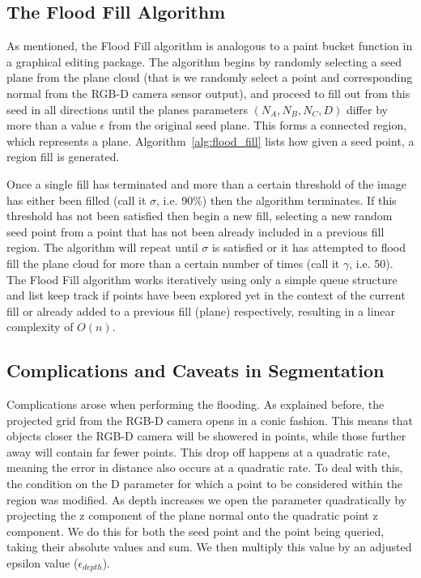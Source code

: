 \documentclass[]{article}
\begin{document}
{\subsection{The Flood Fill Algorithm}
\label{sub:flood_fill_algo}
As mentioned, the Flood Fill algorithm is analogous to a paint bucket function in a graphical editing package. The algorithm begins by randomly selecting a seed plane from the plane cloud (that is we randomly select a point and corresponding normal from the RGB-D camera sensor output), and proceed to fill out from this seed in all directions until the planes parameters $(N_A, N_B, N_C, D)$ differ by more than a value $\epsilon$ from the original seed plane. This forms a connected region, which represents a plane. Algorithm~\ref{alg:flood_fill} lists how given a seed point, a region fill is generated.

Once a single fill has terminated and more than a certain threshold of the image has either been filled (call it $\sigma$, i.e. 90\%) then the algorithm terminates. If this threshold has not been satisfied then begin a new fill, selecting a new random seed point from a point that has not been already included in a previous fill region. The algorithm will repeat until $\sigma$ is satisfied or it has attempted to flood fill the plane cloud for more than a certain number of times (call it $\gamma$, i.e. 50). The Flood Fill algorithm works iteratively using only a simple queue structure and list keep track if points have been explored yet in the context of the current fill or already added to a previous fill (plane) respectively, resulting in a linear complexity of $O(n)$. 


\subsection{Complications and Caveats in Segmentation} %
\label{sub:complications_in_the_segmentation_algorithm}


Complications arose when performing the flooding. As explained before, the projected grid from the RGB-D camera opens in a conic fashion. This means that objects closer the RGB-D camera will be showered in points, while those further away will contain far fewer points. This drop off happens at a quadratic rate, meaning the error in distance also occurs at a quadratic rate. To deal with this, the condition on the D parameter for which a point to be considered within the region was modified. As depth increases we open the parameter quadratically by projecting the z component of the plane normal onto the quadratic point z component. We do this for both the seed point and the point being queried, taking their absolute values and sum. We then multiply this value by an adjusted epsilon value ($\epsilon_{depth}$). 


}
\end{document}
